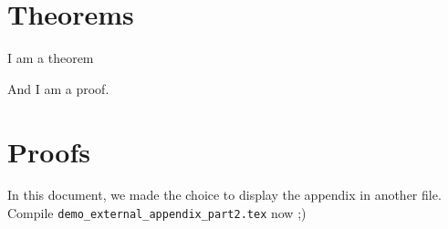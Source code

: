 \documentclass{article}
\begin{document}
\section{Theorems}

\begin{thmE}
  I am a theorem
\end{thmE}
\begin{proofE}
  And I am a proof.
\end{proofE}

\section{Proofs}

In this document, we made the choice to display the appendix in another file.  Compile \verb|demo_external_appendix_part2.tex| now ;)
\end{document}
